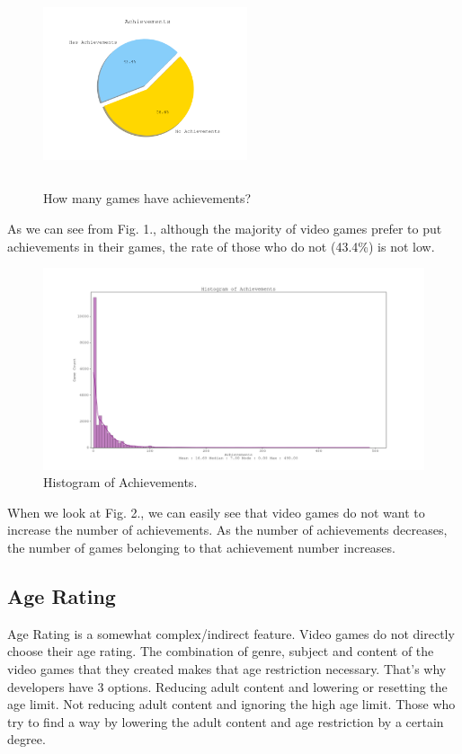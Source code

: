 \documentclass[conference]{IEEEtran}
\begin{document}
\begin{figure}[ht]
  \centering
  \includegraphics[width=6cm,height=6cm,keepaspectratio]{assets-1/achievements_pie.png}
  \caption{How many games have achievements?}
  \label{fig:achievements1}
\end{figure}

As we can see from Fig. 1., although the majority of video games prefer to put achievements in their games, the rate of those who do not (43.4\%) is not low.

\begin{figure}[ht]
  \centering
  \includegraphics[width=\linewidth]{assets-1/achievements_hist.png}
  \caption{Histogram of Achievements.}
  \label{fig:achievements2}
\end{figure}

When we look at Fig. 2., we can easily see that video games do not want to increase the number of achievements. As the number of achievements decreases, the number of games belonging to that achievement number increases.

\subsection{Age Rating}
Age Rating is a somewhat complex/indirect feature. Video games do not directly choose their age rating. The combination of genre, subject  and content of the video games that they created makes that age restriction necessary. That's why developers have 3 options. Reducing adult content and lowering or resetting the age limit. Not reducing adult content and ignoring the high age limit. Those who try to find a way by lowering the adult content and age restriction by a certain degree.
\end{document}
